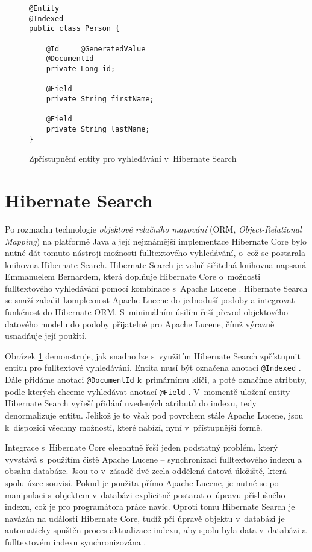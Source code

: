 \documentclass[11pt,oneside]{fithesis2}
\begin{document}
\begin{figure}[hb]
\begin{lstlisting}[frame=single]
@Entity
@Indexed
public class Person {

	@Id 	@GeneratedValue
	@DocumentId
	private Long id;

	@Field
	private String firstName;

	@Field 
	private String lastName;
}
	\end{lstlisting}
	\caption{Zpřístupnění entity pro vyhledávání v~Hibernate Search}
	\label{ExampleHibernateSearch}
\end{figure}

\section{Hibernate Search}
Po rozmachu technologie \emph{objektově relačního mapování} (ORM, \emph{Object-Relational Mapping}) na platformě Java a její nejznámější implementace Hibernate Core \cite[s.~29]{HibernateSearchAction} bylo nutné dát tomuto nástroji možnosti fulltextového vyhledávání, o~což se postarala knihovna Hibernate Search. Hibernate Search je volně šiřitelná knihovna napsaná Emmanuelem Bernardem, která doplňuje Hibernate Core o~možnosti fulltextového vyhledávání pomocí kombinace s~Apache Lucene  \cite[s.~29]{HibernateSearchAction}. Hibernate Search se snaží zabalit komplexnost Apache Lucene do jednoduší podoby a integrovat funkčnost do Hibernate ORM. S~minimálním úsilím řeší převod objektového datového modelu do podoby přijatelné pro Apache Lucene, čímž výrazně usnadňuje její použití.

Obrázek \ref{ExampleHibernateSearch} demonstruje, jak snadno lze s~využitím Hibernate Search zpřístupnit entitu pro fulltextové vyhledávání. Entita musí být označena anotací \texttt{@Indexed}  \cite[s.~38]{HibernateSearchAction}. Dále přidáme anotaci \texttt{@DocumentId} k~primárnímu klíči, a poté označíme atributy, podle kterých chceme vyhledávat anotací \texttt{@Field}  \cite[s.~38]{HibernateSearchAction}. V~momentě uložení entity Hibernate Search vyřeší přidání uvedených atributů do indexu, tedy denormalizuje entitu. Jelikož je to však pod povrchem stále Apache Lucene, jsou k~dispozici všechny možnosti, které nabízí, nyní v~přístupnější formě.

Integrace s~Hibernate Core elegantně řeší jeden podstatný problém, který vyvstává s~použitím čistě Apache Lucene -- synchronizaci fulltextového indexu a obsahu databáze. Jsou to v~zásadě dvě zcela oddělená datová úložiště, která spolu úzce souvisí. Pokud je použita přímo Apache Lucene, je nutné se po manipulaci s~objektem v~databázi explicitně postarat o~úpravu příslušného indexu, což je pro programátora práce navíc. Oproti tomu Hibernate Search je navázán na události Hibernate Core, tudíž při úpravě objektu v~databázi je automaticky spuštěn proces aktualizace indexu, aby spolu byla data v~databázi a fulltextovém indexu synchronizována  \cite[s.~24]{HibernateSearchAction}. 
\end{document}

